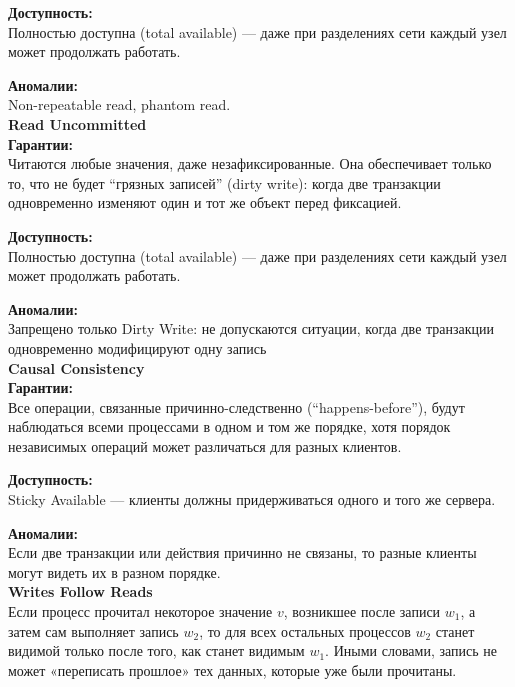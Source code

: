 \textbf{Доступность:}  ~\\
Полностью доступна (total available) — даже при разделениях сети каждый узел может продолжать работать.

\textbf{Аномалии:}  ~\\
Non-repeatable read, phantom read.\autocite{jepsen-read-committed}~\\

\textbf{Read Uncommitted}~\\

\textbf{Гарантии:}  ~\\
Читаются любые значения, даже незафиксированные. Она обеспечивает только то, что не будет “грязных записей” (dirty write):  
когда две транзакции одновременно изменяют один и тот же объект перед фиксацией.

\textbf{Доступность:}  ~\\
Полностью доступна (total available) — даже при разделениях сети каждый узел может продолжать работать.

\textbf{Аномалии:}  ~\\
Запрещено только Dirty Write: не допускаются ситуации, когда две транзакции одновременно модифицируют одну запись\autocite{jepsen-read-uncommitted}~\\

\textbf{Causal Consistency}~\\

\textbf{Гарантии:}  ~\\
Все операции, связанные причинно-следственно (“happens-before”), будут наблюдаться всеми процессами в одном и том же порядке, 
хотя порядок независимых операций может различаться для разных клиентов.

\textbf{Доступность:}  ~\\
Sticky Available — клиенты должны придерживаться одного и того же сервера.

\textbf{Аномалии:}  ~\\
Если две транзакции или действия причинно не связаны, то разные клиенты могут видеть их в разном порядке.\autocite{jepsen-causal}~\\

\textbf{Writes Follow Reads}~\\

Если процесс прочитал некоторое значение $v$, возникшее после записи $w_1$, а затем сам выполняет запись $w_2$, то для всех остальных процессов $w_2$ станет видимой только после того, как станет видимым $w_1$.  
Иными словами, запись не может «переписать прошлое» тех данных, которые уже были прочитаны.\autocite{jepsen-writes-follow-reads}~\\

